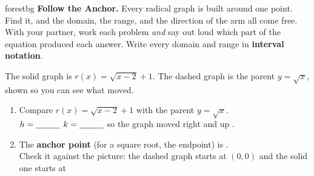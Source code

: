 \documentclass[10pt]{article}
\newcommand{\lgrid}[4]{%
  \draw[step=1, linegray!40, very thin] (#1,#3) grid (#2,#4);
  \draw[->, semithick, charcoal] (#1,0)--(#2,0) node[below right, font=\scriptsize]{$x$};
  \draw[->, semithick, charcoal] (0,#3)--(0,#4) node[left, font=\scriptsize]{$y$};}
\begin{document}
\namepartnerperiod

\vspace{0.08in}

\begin{headlinebox}{forestbg}
\small\textbf{Follow the Anchor.} Every radical graph is built around one point. Find it, and the
domain, the range, and the direction of the arm all come free. With your partner, work each problem
\emph{and} say out loud which part of the equation produced each answer. Write every domain and
range in \textbf{interval notation}.
\end{headlinebox}

\vspace{0.06in}

\begin{tcolorbox}[colback=white, colframe=black!40, title=\textbf{Tier R --- Remediate},
    fonttitle=\bfseries, arc=1.5mm, left=3mm, right=3mm, top=2mm, bottom=2mm, breakable]
The solid graph is $r(x)=\sqrt{x-2}+1$. The dashed graph is the parent $y=\sqrt{x}$, shown so you
can see what moved.
\begin{center}
\end{center}
\begin{enumerate}[leftmargin=1.7em, itemsep=7pt]
  \item Compare $r(x)=\sqrt{x-2}+1$ with the parent $y=\sqrt{x}$. \\
        $h=\blank{1.0cm}$ \quad $k=\blank{1.0cm}$ \quad so the graph moved right \blank{1.0cm}
        and up \blank{1.0cm}.
  \item The \textbf{anchor point} (for a square root, the endpoint) is \blank{2.0cm}. \\
        Check it against the picture: the dashed graph starts at $(0,0)$ and the solid one starts at

\end{enumerate}
\end{tcolorbox}
\end{document}
